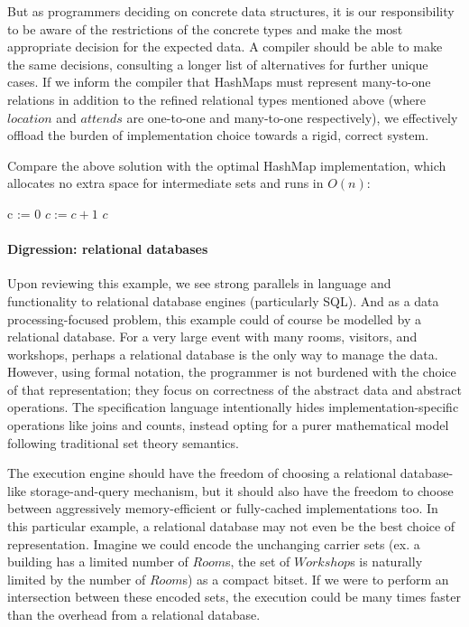 But as programmers deciding on concrete data structures, it is our responsibility to be aware of the restrictions of the concrete types and make the most appropriate decision for the expected data. A compiler should be able to make the same decisions, consulting a longer list of alternatives for further unique cases. If we inform the compiler that HashMaps must represent many-to-one relations in addition to the refined relational types mentioned above (where $location$ and $attends$ are one-to-one and many-to-one respectively), we effectively offload the burden of implementation choice towards a rigid, correct system.

Compare the above solution with the optimal HashMap implementation, which allocates no extra space for intermediate sets and runs in $O(n)$:
\begin{algorithmic}
        \State c := 0
                \State $c := c + 1$
            \EndIf
        \EndFor
        \Return $c$
    \EndFunction
\end{algorithmic}

\paragraph{Digression: relational databases} Upon reviewing this example, we see strong parallels in language and functionality to relational database engines (particularly SQL). And as a data processing-focused problem, this example could of course be modelled by a relational database. For a very large event with many rooms, visitors, and workshops, perhaps a relational database is the only way to manage the data. However, using formal notation, the programmer is not burdened with the choice of that representation; they focus on correctness of the abstract data and abstract operations. The specification language intentionally hides implementation-specific operations like joins and counts, instead opting for a purer mathematical model following traditional set theory semantics.

The execution engine should have the freedom of choosing a relational database-like storage-and-query mechanism, but it should also have the freedom to choose between aggressively memory-efficient or fully-cached implementations too. In this particular example, a relational database may not even be the best choice of representation. Imagine we could encode the unchanging carrier sets (ex. a building has a limited number of $Room$s, the set of $Workshop$s is naturally limited by the number of $Room$s) as a compact bitset. If we were to perform an intersection between these encoded sets, the execution could be many times faster than the overhead from a relational database.

